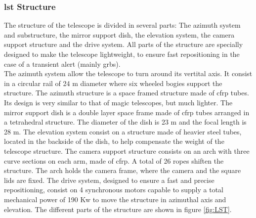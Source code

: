 \documentclass[main.tex]{subfiles}
\begin{document}
\subsubsection{\gls{lst} Structure}

The structure of the telescope is divided in several parts: The azimuth system and substructure, the mirror support dish, the elevation system, the camera support structure and the drive system. All parts of the structure are specially designed to make the telescope lightweight, to ensure fast repositioning in the case of a transient alert (mainly \glspl{grb}).\\
The azimuth system allow the telescope to turn around its vertital axis. It consist in a circular rail of 24 m diameter where six wheeled bogies support the structure. The azimuth structure is a space framed structure made of \gls{cfrp} tubes. Its design is very similar to that of \gls{magic} telescopes, but much lighter. The mirror support dish is a double layer space frame made of \gls{cfrp} tubes arranged in a tetrahedral structure. The diameter of the dish is 23 m and the focal length is 28 m. The elevation system consist on a structure made of heavier steel tubes, located in the backside of the dish, to help compensate the weight of the telescope structure. The camera support structure consists on an arch with three curve sections on each arm, made of \gls{cfrp}. A total of 26 ropes shiften the structure. The arch holds the camera frame, where the camera and the square lids are fixed. The drive system, designed to ensure a fast and precise repositioning, consist on 4 synchronous motors capable to supply a total mechanical power of 190 Kw to move the structure in azimuthal axis and elevation. The different parts of the structure are shown in figure \ref{fig:LST}.
    
\end{document}
